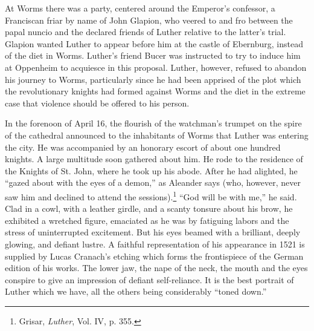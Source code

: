 At Worms there was a party, centered around the Emperor’s confessor,
a Franciscan friar by name of John Glapion, who veered to
and fro between the papal nuncio and the declared friends of
Luther relative to the latter’s trial. Glapion wanted Luther to appear
before him at the castle of Ebernburg, instead of the diet in Worms.
Luther’s friend Bucer was instructed to try to induce him at Oppenheim
to acquiesce in this proposal. Luther, however, refused to
abandon his journey to Worms, particularly since he had been apprised of
the plot which the revolutionary knights had formed
against Worms and the diet in the extreme case that violence should
be offered to his person.

In the forenoon of April 16, the flourish of the watchman’s
trumpet on the spire of the cathedral announced to the inhabitants
of Worms that Luther was entering the city. He was accompanied
by an honorary escort of about one hundred knights. A large multitude soon
gathered about him. He rode to the residence of the
Knights of St. John, where he took up his abode. After he had
alighted, he “gazed about with the eyes of a demon,” as Aleander
says (who, however, never saw him and declined to attend the sessions).\footnote
{Grisar, \textit{Luther}, Vol. IV, p. 355.}
“God will be with me,” he said. Clad in a cowl, with a leather
girdle, and a scanty tonsure about his brow, he exhibited a wretched
figure, emaciated as he was by fatiguing labors and the stress of
uninterrupted excitement. But his eyes beamed with a brilliant, deeply
glowing, and defiant lustre. A faithful representation of his appearance
in 1521 is supplied by Lucas Cranach’s etching which forms
the frontispiece of the German edition of his works. The lower jaw,
the nape of the neck, the mouth and the eyes conspire to give an
impression of defiant self-reliance. It is the best portrait of Luther
which we have, all the others being considerably “toned down.”

